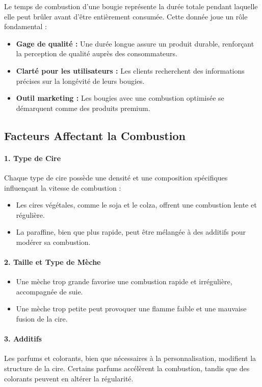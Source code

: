 \documentclass[11pt,fleqn,onecolumn,oneside]{book}
\begin{document}
Le temps de combustion d’une bougie représente la durée totale pendant laquelle elle peut brûler avant d’être entièrement consumée. Cette donnée joue un rôle fondamental :
\begin{itemize}
    \item \textbf{Gage de qualité :} Une durée longue assure un produit durable, renforçant la perception de qualité auprès des consommateurs.
    \item \textbf{Clarté pour les utilisateurs :} Les clients recherchent des informations précises sur la longévité de leurs bougies.
    \item \textbf{Outil marketing :} Les bougies avec une combustion optimisée se démarquent comme des produits premium.
\end{itemize}

\subsection*{Facteurs Affectant la Combustion}

\paragraph{1. Type de Cire}
Chaque type de cire possède une densité et une composition spécifiques influençant la vitesse de combustion :
\begin{itemize}
    \item Les cires végétales, comme le soja et le colza, offrent une combustion lente et régulière.
    \item La paraffine, bien que plus rapide, peut être mélangée à des additifs pour modérer sa combustion.
\end{itemize}

\paragraph{2. Taille et Type de Mèche}
\begin{itemize}
    \item Une mèche trop grande favorise une combustion rapide et irrégulière, accompagnée de suie.
    \item Une mèche trop petite peut provoquer une flamme faible et une mauvaise fusion de la cire.
\end{itemize}

\paragraph{3. Additifs}
Les parfums et colorants, bien que nécessaires à la personnalisation, modifient la structure de la cire. Certains parfums accélèrent la combustion, tandis que des colorants peuvent en altérer la régularité.
\end{document}
